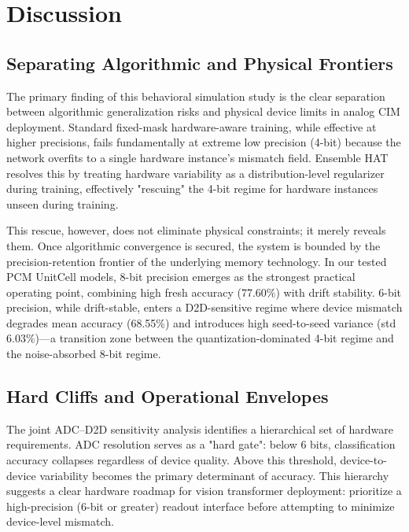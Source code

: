 \section{Discussion}
\label{sec:discussion}

\subsection{Separating Algorithmic and Physical Frontiers}
\label{subsec:separating-frontiers}

The primary finding of this behavioral simulation study is the clear separation between algorithmic generalization risks and physical device limits in analog CIM deployment. Standard fixed-mask hardware-aware training, while effective at higher precisions, fails fundamentally at extreme low precision (4-bit) because the network overfits to a single hardware instance's mismatch field. Ensemble HAT resolves this by treating hardware variability as a distribution-level regularizer during training, effectively "rescuing" the 4-bit regime for hardware instances unseen during training.

This rescue, however, does not eliminate physical constraints; it merely reveals them. Once algorithmic convergence is secured, the system is bounded by the precision-retention frontier of the underlying memory technology. In our tested PCM UnitCell models, 8-bit precision emerges as the strongest practical operating point, combining high fresh accuracy (77.60\%) with drift stability. 6-bit precision, while drift-stable, enters a D2D-sensitive regime where device mismatch degrades mean accuracy (68.55\%) and introduces high seed-to-seed variance (std 6.03\%)---a transition zone between the quantization-dominated 4-bit regime and the noise-absorbed 8-bit regime.

\subsection{Hard Cliffs and Operational Envelopes}
\label{subsec:hard-cliffs}

The joint ADC--D2D sensitivity analysis identifies a hierarchical set of hardware requirements. ADC resolution serves as a "hard gate": below 6 bits, classification accuracy collapses regardless of device quality. Above this threshold, device-to-device variability becomes the primary determinant of accuracy. This hierarchy suggests a clear hardware roadmap for vision transformer deployment: prioritize a high-precision (6-bit or greater) readout interface before attempting to minimize device-level mismatch.

